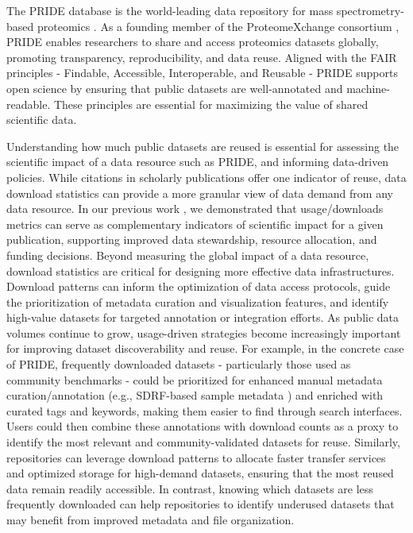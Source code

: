 \documentclass[11pt,a4paper]{article}
\begin{document}
The PRIDE database is the world-leading data repository for mass spectrometry-based proteomics \citep{PerezRiverol2025}. As a founding member of the ProteomeXchange consortium \citep{Deutsch2026}, PRIDE enables researchers to share and access proteomics datasets globally, promoting transparency, reproducibility, and data reuse. Aligned with the FAIR principles - Findable, Accessible, Interoperable, and Reusable \citep{Wilkinson2016} - PRIDE supports open science by ensuring that public datasets are well-annotated and machine-readable. These principles are essential for maximizing the value of shared scientific data.

Understanding how much public datasets are reused is essential for assessing the scientific impact of a data resource such as PRIDE, and informing data-driven policies. While citations in scholarly publications offer one indicator of reuse, data download statistics can provide a more granular view of data demand from any data resource. In our previous work \citep{PerezRiverol2019}, we demonstrated that usage/downloads metrics can serve as complementary indicators of scientific impact for a given publication, supporting improved data stewardship, resource allocation, and funding decisions. Beyond measuring the global impact of a data resource, download statistics are critical for designing more effective data infrastructures. Download patterns can inform the optimization of data access protocols, guide the prioritization of metadata curation and visualization features, and identify high-value datasets for targeted annotation or integration efforts. As public data volumes continue to grow, usage-driven strategies become increasingly important for improving dataset discoverability and reuse. For example, in the concrete case of PRIDE, frequently downloaded datasets - particularly those used as community benchmarks - could be prioritized for enhanced manual metadata curation/annotation (e.g., SDRF-based sample metadata \citep{Dai2021}) and enriched with curated tags and keywords, making them easier to find through search interfaces. Users could then combine these annotations with download counts as a proxy to identify the most relevant and community-validated datasets for reuse. Similarly, repositories can leverage download patterns to allocate faster transfer services and optimized storage for high-demand datasets, ensuring that the most reused data remain readily accessible. In contrast, knowing which datasets are less frequently downloaded can help repositories to identify underused datasets that may benefit from improved metadata and file organization.
\end{document}
